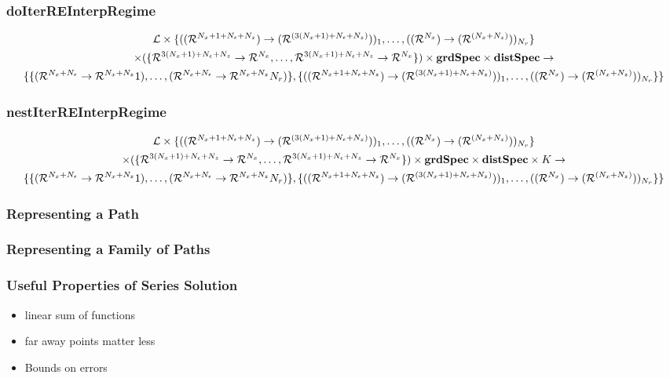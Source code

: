 \documentclass[tikz]{beamer}
\begin{document}
\begin{frame}
\frametitle{doIterREInterpRegime}
\label{sec:doiterreinterp}

\begin{gather*}
  \linMod \times 
\{(\lilXRegimeFuncSig)_1,\ldots,(\xzFuncGuessSig)_{\numR}\}  \\
 \times (\eqnRegimeFuncSig ) \times \grdSpec \times \dstSpec \rightarrow\\
\{\frfpnsRegimeFuncSig, \{(\lilXRegimeFuncSig)_1,\ldots,(\xzFuncGuessSig)_{\numR}\}\}
\end{gather*}



\end{frame}

\begin{frame}
\frametitle{nestIterREInterpRegime}
\label{sec:nestiterreinterp}



\begin{gather*}
  \linMod \times 
\{(\lilXRegimeFuncSig)_1,\ldots,(\xzFuncGuessSig)_{\numR}\}  \\
 \times (\eqnRegimeFuncSig ) \times \grdSpec \times \dstSpec  \times \numIters \rightarrow\\
\{\frfpnsRegimeFuncSig, \{(\lilXRegimeFuncSig)_1,\ldots,(\xzFuncGuessSig)_{\numR}\}\}
\end{gather*}


\end{frame}

\begin{frame}
\frametitle{Representing a Path}

\end{frame}
\begin{frame}
\frametitle{Representing a Family of Paths}

\end{frame}

\begin{frame}
\frametitle{Useful Properties of Series Solution}

\begin{itemize}
\item linear sum of functions
\item far away points matter less
\item Bounds on errors
\end{itemize}



\end{frame}
\end{document}
